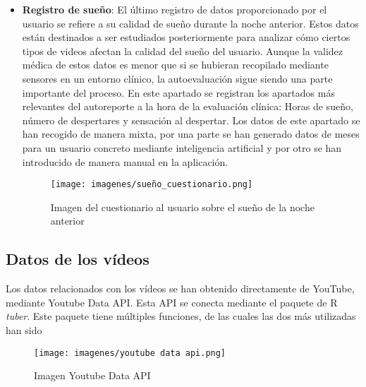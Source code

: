 \documentclass[a4paper,12pt,twoside]{memoir}
\begin{document}
\begin{itemize}
    \item \textbf{Registro de sueño}: El último registro de datos proporcionado por el usuario se refiere a su calidad de sueño durante la noche anterior. Estos datos están destinados a ser estudiados posteriormente para analizar cómo ciertos tipos de videos afectan la calidad del sueño del usuario. Aunque la validez médica de estos datos es menor que si se hubieran recopilado mediante sensores en un entorno clínico, la autoevaluación sigue siendo una parte importante del proceso. En este apartado se registran los apartados más relevantes del autoreporte a la hora de la evaluación clínica: Horas de sueño, número de despertares y sensación al despertar. Los datos de este apartado se han recogido de manera mixta, por una parte se han generado datos de meses para un usuario concreto mediante inteligencia artificial y por otro se han introducido de manera manual en la aplicación.
    \begin{figure}
        \centering
        \texttt{[image: imagenes/sueño\_cuestionario.png]} 
        \caption{Imagen del cuestionario al usuario sobre el sueño de la noche anterior}
        \label{fig:ejemplo}
    \end{figure}
    
\end{itemize}
\subsection{Datos de los vídeos}

Los datos relacionados con los vídeos se han obtenido directamente de YouTube, mediante Youtube Data API. Esta API se conecta mediante el paquete de R \textit{tuber}. Este paquete tiene múltiples funciones, de las cuales las dos más utilizadas han sido 
\begin{figure}
        \centering
        \texttt{[image: imagenes/youtube data api.png]} 
        \caption{Imagen Youtube Data API \cite{google}}
        \label{fig:ejemplo}
    \end{figure}
\end{document}
